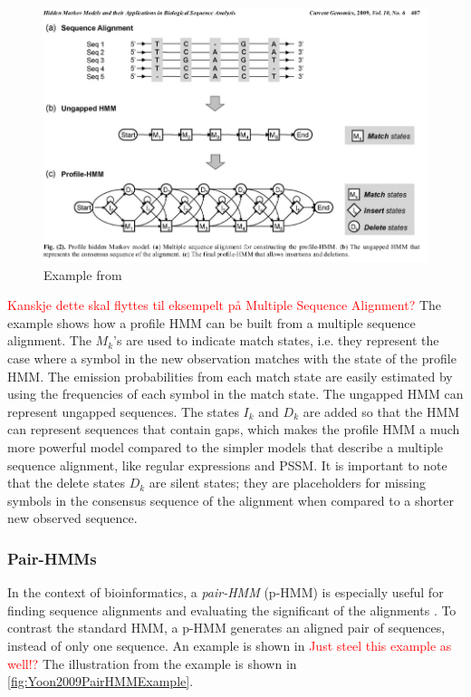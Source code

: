 \documentclass{article}
\begin{document}
\begin{figure}
    \centering
    \includegraphics[width = \textwidth]{exampleProfileHMM.png}
    \caption{Example from \cite{Yoon2009}}
    \label{fig:Yoon2009ProfileHMMExample}
\end{figure}

\textcolor{red}{Kanskje dette skal flyttes til eksempelt på Multiple Sequence Alignment?}
The example shows how a profile HMM can be built from a multiple sequence alignment. The $M_k$'s are used to indicate match states, i.e. they represent the case where a symbol in the new observation matches with the state of the profile HMM. The emission probabilities from each match state are easily estimated by using the frequencies of each symbol in the match state. The ungapped HMM can represent ungapped sequences. The states $I_k$ and $D_k$ are added so that the HMM can represent sequences that contain gaps, which makes the profile HMM a much more powerful model compared to the simpler models that describe a multiple sequence alignment, like regular expressions and PSSM. It is important to note that the delete states $D_k$ are silent states; they are placeholders for missing symbols in the consensus sequence of the alignment when compared to a shorter new observed sequence. 

\subsubsection{Pair-HMMs}
In the context of bioinformatics, a \textit{pair-HMM} (p-HMM) is especially useful for finding sequence alignments and evaluating the significant of the alignments \cite{Yoon2009}. To contrast the standard HMM, a p-HMM generates an aligned pair of sequences, instead of only one sequence. An example is shown in \cite{Yoon2009} \textcolor{red}{Just steel this example as well!?} The illustration from the example is shown in \ref{fig:Yoon2009PairHMMExample}.
\end{document}
